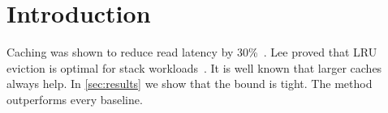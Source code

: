 \documentclass{article}
\begin{document}
\begin{abstract}
We prove that the cache bound is tight.
The cache uses 40\% less energy than a disk.
\end{abstract}

\section{Introduction}\label{sec:intro}
Caching was shown to reduce read latency by 30\%~\cite{smith2020}.
Lee proved that LRU eviction is optimal for stack workloads~\cite{lee2021}.
It is well known that larger caches always help.
In \cref{sec:results} we show that the bound is tight.
The method outperforms every baseline.




\end{document}
